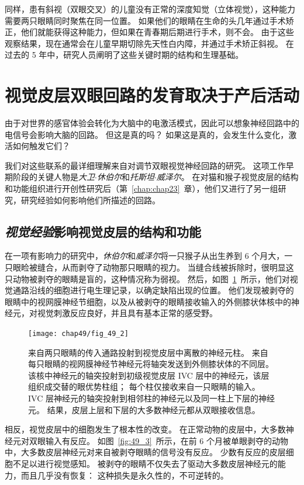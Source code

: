 同样，患有斜视（双眼交叉）的儿童没有正常的深度知觉（立体视觉），这种能力需要两只眼睛同时聚焦在同一位置。
如果他们的眼睛在生命的头几年通过手术矫正，他们就能获得这种能力，但如果在青春期后期进行手术，则不会。
由于这些观察结果，现在通常会在儿童早期切除先天性白内障，并通过手术矫正斜视。
在过去的 5 年中，研究人员阐明了这些关键时期的结构和生理基础。



\section{视觉皮层双眼回路的发育取决于产后活动}

由于对世界的感官体验会转化为大脑中的电激活模式，因此可以想象神经回路中的电信号会影响大脑的回路。
但这是真的吗？
如果这是真的，会发生什么变化，激活如何触发它们？


我们对这些联系的最详细理解来自对调节双眼视觉神经回路的研究。
这项工作早期阶段的关键人物是\textit{大卫$\cdot$休伯尔}和\textit{托斯坦$\cdot$威泽尔}。
在对猫和猴子视觉皮层的结构和功能组织进行开创性研究后（第~\ref{chap:chap23}~章），他们又进行了另一组研究，研究经验如何影响他们所描述的回路。



\subsection{\textit{视觉经验}影响视觉皮层的结构和功能}

在一项有影响力的研究中，\textit{休伯尔}和\textit{威泽尔}将一只猴子从出生养到 6 个月大，一只眼睑被缝合，从而剥夺了动物那只眼睛的视力。
当缝合线被拆除时，很明显这只动物被剥夺的眼睛是盲的，这种情况称为弱视。
然后，如图~\ref{fig:49_2}~所示，他们对视觉通路沿线的细胞进行电生理记录，以确定缺陷出现的位置。
他们发现被剥夺的眼睛中的视网膜神经节细胞，以及从被剥夺的眼睛接收输入的外侧膝状体核中的神经元，对视觉刺激反应良好，并且具有基本正常的感受野。


\begin{figure}[htbp]
	\centering
	\texttt{[image: chap49/fig\_49\_2]}
	\caption{来自两只眼睛的传入通路投射到视觉皮层中离散的神经元柱。
		来自每只眼睛的视网膜神经节神经元将轴突发送到外侧膝状体的不同层。
		该核中神经元的轴突投射到初级视觉皮层 IVC 层中的神经元，该层组织成交替的眼优势柱组；
		每个柱仅接收来自一只眼睛的输入。
		IVC 层神经元的轴突投射到相邻柱的神经元以及同一柱上下层的神经元。
		结果，皮层上层和下层的大多数神经元都从双眼接收信息。}
	\label{fig:49_2}
\end{figure}


相反，视觉皮层中的细胞发生了根本性的改变。
在正常动物的皮层中，大多数神经元对双眼输入有反应。
如图~\ref{fig:49_3}~所示，在前 6 个月被单眼剥夺的动物中，大多数皮层神经元对来自被剥夺眼睛的信号没有反应。
少数有反应的皮层细胞不足以进行视觉感知。
被剥夺的眼睛不仅失去了驱动大多数皮层神经元的能力，而且几乎没有恢复：
这种损失是永久性的，不可逆转的。


